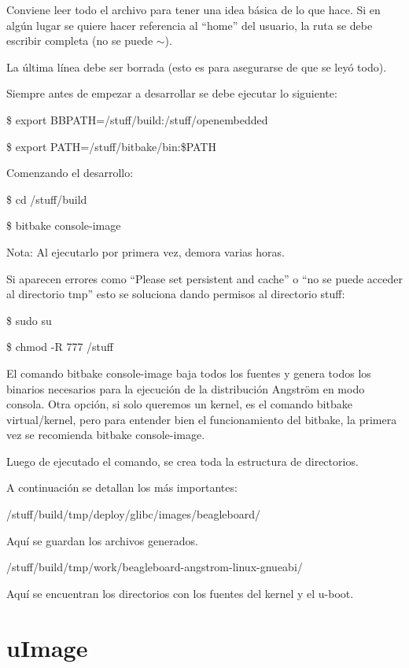 \bigskip
Conviene leer todo el archivo para tener una idea básica de lo que hace. Si en algún lugar se quiere hacer referencia al “home” del usuario, la ruta se debe escribir completa (no se puede $\sim$).

La última línea debe ser borrada (esto es para asegurarse de que se leyó todo). 

\bigskip
{}

\bigskip
Siempre antes de empezar a desarrollar se debe ejecutar lo siguiente:

\bigskip
\centerline{\$ export BBPATH=/stuff/build:/stuff/openembedded}

\centerline{\$ export PATH=/stuff/bitbake/bin:\$PATH}

\bigskip
Comenzando el desarrollo:

\bigskip
\centerline{\$ cd /stuff/build}

\centerline{\$ bitbake console-image}

\bigskip
Nota: Al ejecutarlo por primera vez, demora varias horas. 

\bigskip
Si aparecen errores como “Please set persistent and cache” o “no se puede acceder al directorio tmp” esto se soluciona dando permisos al directorio stuff:

\bigskip
\centerline{\$ sudo su}

\centerline{\$ chmod -R 777 /stuff}

\bigskip
El comando bitbake console-image baja todos los fuentes y genera todos los binarios necesarios para la ejecución de la  distribución Angström en modo consola. Otra opción, si solo queremos un kernel, es el comando bitbake virtual/kernel, pero para entender bien el funcionamiento del bitbake, la primera vez se recomienda bitbake console-image.

\bigskip
Luego de ejecutado el comando, se crea toda la estructura de directorios.

\bigskip
A continuación se detallan los más importantes:

\bigskip
/stuff/build/tmp/deploy/glibc/images/beagleboard/ 

Aquí se guardan los archivos generados.

\bigskip
/stuff/build/tmp/work/beagleboard-angstrom-linux-gnueabi/

Aquí se encuentran los directorios con los fuentes del kernel y el u-boot.

\section{uImage}\label{anx_sw_uIm}

